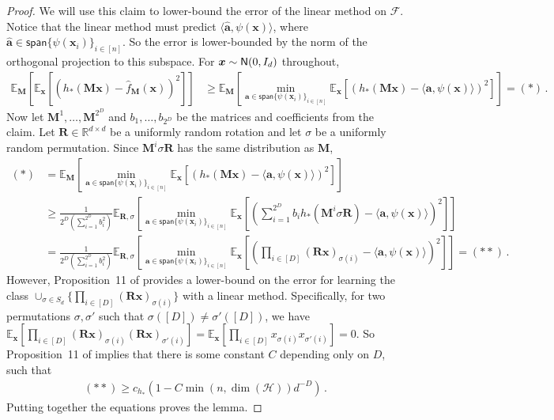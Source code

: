 \documentclass[11pt]{article}
\newcommand{\E}{\mathbb{E}}
\newcommand{\R}{\mathbb{R}}
\newcommand{\<}{\langle}
\renewcommand{\>}{\rangle}
\theoremstyle{definition}
\def\bM{{\boldsymbol M}}
\def\bR{{\boldsymbol R}}
\def\ba{{\boldsymbol a}}
\def\bx{{\boldsymbol x}}
\def\cF{{\mathcal F}}
\def\cH{{\mathcal H}}
\def\normal{{\sf N}}
\def\normal{{\sf N}}
\def\normal{{\sf N}}
\def\bx{{\boldsymbol x}}
\def\ba{{\boldsymbol a}}
\def\cF{{\mathcal F}}
\def\normal{{\sf N}}
\def\bR{{\boldsymbol R}}
\def\cH{\mathcal{H}}
\def\Span{\mathsf{span}}
\begin{document}
\begin{proof}
We will use this claim to lower-bound the error of the linear method on $\cF$. Notice that the linear method must predict $\<\hat{\ba}, \psi(\bx)\>$, where $\hat{\ba} \in \Span\{\psi(\bx_i)\}_{i \in [n]}$. So the error is lower-bounded by the norm of the orthogonal projection to this subspace. For $\bx \sim \normal(0,I_d)$ throughout,
\begin{align*}
\E_{\bM}[\E_{\bx}[(h_*(\bM\bx) - \hat{f}_{\bM}(\bx))^2]] &\geq \E_{\bM}[\min_{\ba \in \Span\{\psi(\bx_i)\}_{i \in [n]}}\E_{\bx}[(h_*(\bM\bx) - \<\ba, \psi(\bx)\>)^2]] = (\ast)\,.
\end{align*}
Now let $\bM^1,\ldots,\bM^{2^D}$ and $b_1,\ldots,b_{2^D}$ be the matrices and coefficients from the claim. Let $\bR \in \R^{d \times d}$ be a uniformly random rotation and let $\sigma$ be a uniformly random permutation. Since $\bM^i \sigma \bR$ has the same distribution as $\bM$,
\begin{align*}
(\ast) &= \E_{\bM}[\min_{\ba \in \Span\{\psi(\bx_i)\}_{i \in [n]}}\E_{\bx}[(h_*(\bM \bx) - \<\ba, \psi(\bx)\>)^2]] \\
&\geq \frac{1}{2^D (\sum_{i=1}^{2^D}b_i^2)}\E_{\bR,\sigma}[\min_{\ba \in \Span\{\psi(\bx_i)\}_{i \in [n]}}\E_{\bx}[(\sum_{i=1}^{2^D} b_i h_*(\bM^i \sigma \bR) - \<\ba, \psi(\bx)\>)^2]] \\
&= \frac{1}{2^D (\sum_{i=1}^{2^D}b_i^2)} \E_{\bR,\sigma}[\min_{\ba \in \Span\{\psi(\bx_i)\}_{i \in [n]}}\E_{\bx}[(\prod_{i\in [D]}(\bR \bx)_{\sigma(i)} - \<\ba, \psi(\bx)\>)^2]] = (\ast\ast)\,.
\end{align*}
However, Proposition~11 of \cite{abbe2022merged} provides a lower-bound on the error for learning the class $\cup_{\sigma \in S_d}\{\prod_{i \in [D]} (\bR \bx)_{\sigma(i)}\}$ with a linear method. Specifically, for two permutations $\sigma,\sigma'$ such that $\sigma([D]) \neq \sigma'([D])$, we have $\E_{\bx}[\prod_{i \in [D]}(\bR \bx)_{\sigma(i)} (\bR \bx)_{\sigma'(i)}] = \E_{\bx}[\prod_{i \in [D]}x_{\sigma(i)} x_{\sigma'(i)}] = 0$. So Proposition~11 of \cite{abbe2022merged} implies that there is some constant $C$ depending only on $D$, such that
\begin{align*}
(\ast\ast) \geq c_{h_*}(1 - C \min(n, \dim(\cH))d^{-D})\,.
\end{align*}
Putting together the equations proves the lemma.










\end{proof}
\end{document}
